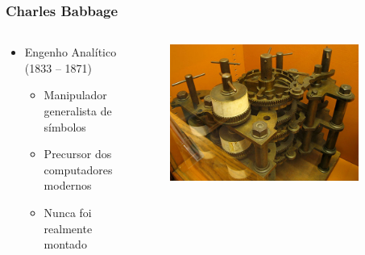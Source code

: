 \documentclass[aspectratio=169,
				xcolor=table]{beamer}
\begin{document}
	\begin{frame}
		\frametitle{Charles Babbage}
		\begin{columns}
			\begin{column}{0.6\textwidth}
				\begin{itemize}
					\item Engenho Analítico (1833 – 1871)
					\begin{itemize}
						\item Manipulador generalista de símbolos
						\item Precursor dos computadores modernos
						\item Nunca foi realmente montado
					\end{itemize}
				\end{itemize}
			\end{column}
			\begin{column}{0.4\textwidth}
				\begin{figure}
					\centering
					\includegraphics[width=0.9\textwidth, keepaspectratio]{../figs/cap03/babbage2} 		
				\end{figure}
			\end{column}
		\end{columns}
	\end{frame}	
	
\end{document}

